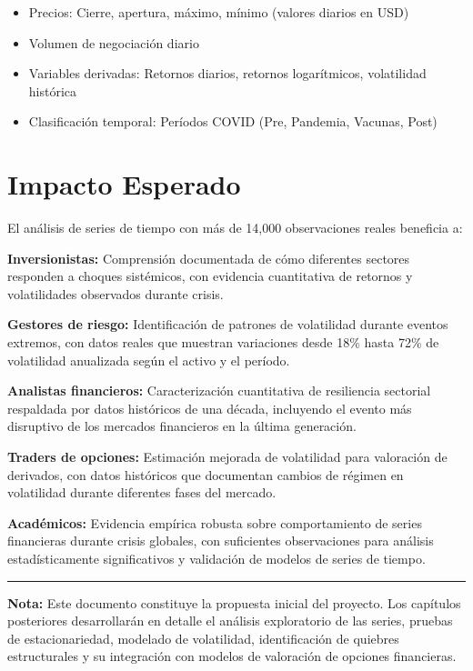\documentclass[
]{book}
\providecommand{\tightlist}{%
  \setlength{\itemsep}{0pt}\setlength{\parskip}{0pt}}
\begin{document}
\begin{itemize}
\tightlist
\item
  Precios: Cierre, apertura, máximo, mínimo (valores diarios en USD)
\item
  Volumen de negociación diario
\item
  Variables derivadas: Retornos diarios, retornos logarítmicos, volatilidad histórica
\item
  Clasificación temporal: Períodos COVID (Pre, Pandemia, Vacunas, Post)
\end{itemize}

\section{Impacto Esperado}\label{impacto-esperado}

El análisis de series de tiempo con más de 14,000 observaciones reales beneficia a:

\textbf{Inversionistas:} Comprensión documentada de cómo diferentes sectores responden a choques sistémicos, con evidencia cuantitativa de retornos y volatilidades observados durante crisis.

\textbf{Gestores de riesgo:} Identificación de patrones de volatilidad durante eventos extremos, con datos reales que muestran variaciones desde 18\% hasta 72\% de volatilidad anualizada según el activo y el período.

\textbf{Analistas financieros:} Caracterización cuantitativa de resiliencia sectorial respaldada por datos históricos de una década, incluyendo el evento más disruptivo de los mercados financieros en la última generación.

\textbf{Traders de opciones:} Estimación mejorada de volatilidad para valoración de derivados, con datos históricos que documentan cambios de régimen en volatilidad durante diferentes fases del mercado.

\textbf{Académicos:} Evidencia empírica robusta sobre comportamiento de series financieras durante crisis globales, con suficientes observaciones para análisis estadísticamente significativos y validación de modelos de series de tiempo.

\begin{center}\rule{0.5\linewidth}{0.5pt}\end{center}

\textbf{Nota:} Este documento constituye la propuesta inicial del proyecto. Los capítulos posteriores desarrollarán en detalle el análisis exploratorio de las series, pruebas de estacionariedad, modelado de volatilidad, identificación de quiebres estructurales y su integración con modelos de valoración de opciones financieras.
\end{document}
